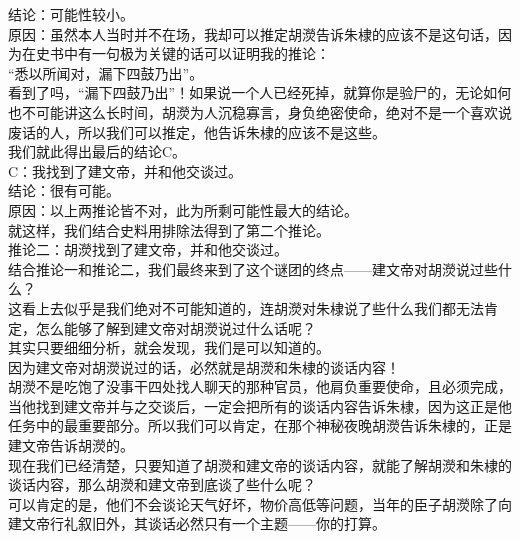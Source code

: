 \begin{multicols}{\theparacolNo}
结论：可能性较小。\\

原因：虽然本人当时并不在场，我却可以推定胡濙告诉朱棣的应该不是这句话，因为在史书中有一句极为关键的话可以证明我的推论：\\

“悉以所闻对，漏下四鼓乃出”。\\

看到了吗，“漏下四鼓乃出”！如果说一个人已经死掉，就算你是验尸的，无论如何也不可能讲这么长时间，胡濙为人沉稳寡言，身负绝密使命，绝对不是一个喜欢说废话的人，所以我们可以推定，他告诉朱棣的应该不是这些。\\

我们就此得出最后的结论C。\\

C：我找到了建文帝，并和他交谈过。\\

结论：很有可能。\\

原因：以上两推论皆不对，此为所剩可能性最大的结论。\\

就这样，我们结合史料用排除法得到了第二个推论。\\

推论二：胡濙找到了建文帝，并和他交谈过。\\

结合推论一和推论二，我们最终来到了这个谜团的终点——建文帝对胡濙说过些什么？\\

这看上去似乎是我们绝对不可能知道的，连胡濙对朱棣说了些什么我们都无法肯定，怎么能够了解到建文帝对胡濙说过什么话呢？\\

其实只要细细分析，就会发现，我们是可以知道的。\\

因为建文帝对胡濙说过的话，必然就是胡濙和朱棣的谈话内容！\\

胡濙不是吃饱了没事干四处找人聊天的那种官员，他肩负重要使命，且必须完成，当他找到建文帝并与之交谈后，一定会把所有的谈话内容告诉朱棣，因为这正是他任务中的最重要部分。所以我们可以肯定，在那个神秘夜晚胡濙告诉朱棣的，正是建文帝告诉胡濙的。\\

现在我们已经清楚，只要知道了胡濙和建文帝的谈话内容，就能了解胡濙和朱棣的谈话内容，那么胡濙和建文帝到底谈了些什么呢？\\

可以肯定的是，他们不会谈论天气好坏，物价高低等问题，当年的臣子胡濙除了向建文帝行礼叙旧外，其谈话必然只有一个主题——你的打算。\\


\end{multicols}
